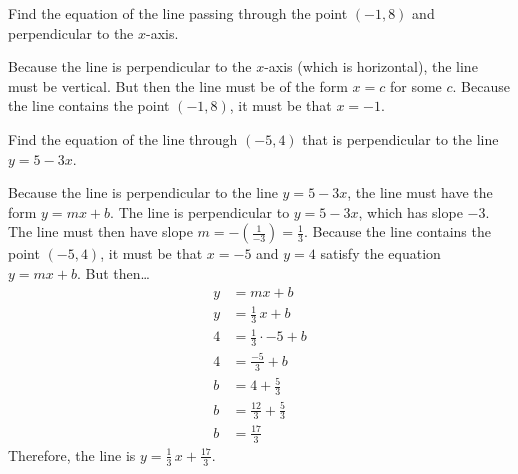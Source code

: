 \documentclass[11pt,letterpaper]{article}
\begin{document}

 Find the equation of the line passing through the point $(-1, 8)$ and perpendicular to the $x$-axis. \pspace

\sol Because the line is perpendicular to the $x$-axis (which is horizontal), the line must be vertical. But then the line must be of the form $x= c$ for some $c$. Because the line contains the point $(-1, 8)$, it must be that $x= -1$. 



\newpage



 Find the equation of the line through $(-5, 4)$ that is perpendicular to the line $y= 5 - 3x$. \pspace

\sol Because the line is perpendicular to the line $y= 5 - 3x$, the line must have the form $y= mx + b$. The line is perpendicular to $y= 5 - 3x$, which has slope $-3$. The line must then have slope $m= - \left( \frac{1}{-3} \right)= \frac{1}{3}$. Because the line contains the point $(-5, 4)$, it must be that $x= -5$ and $y= 4$ satisfy the equation $y= mx + b$. But then\dots
	\[
	\begin{aligned}
	y&= mx + b \\[0.3cm]
	y&= \frac{1}{3}\,x + b \\[0.3cm]
	4&= \frac{1}{3} \cdot -5 + b \\[0.3cm]
	4&= \frac{-5}{3} + b \\[0.3cm]
	b&= 4 + \frac{5}{3} \\[0.3cm]
	b&= \frac{12}{3} + \frac{5}{3} \\[0.3cm]
	b&= \frac{17}{3}
	\end{aligned}
	\]
Therefore, the line is $y= \frac{1}{3}\,x + \frac{17}{3}$. 
\end{document}
